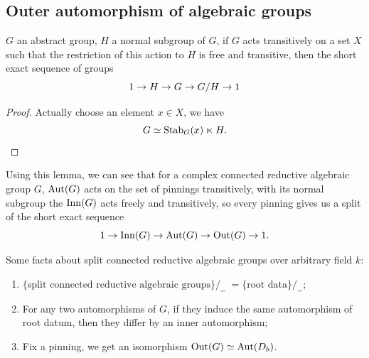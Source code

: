 \subsection{Outer automorphism of algebraic groups}

\begin{lem}
  $G$ an abstract group, $H$ a normal subgroup of $G$, if $G$ acts
  transitively on a set $X$ such that the restriction of this action
  to $H$ is free and transitive, then the short exact sequence of groups
  \[1\rightarrow H\rightarrow G\rightarrow G/H\rightarrow 1\]
\end{lem}

\begin{proof}
  Actually choose an element $x \in X$, we have
  \[ G \simeq \operatorname{Stab}_{G}(x) \ltimes H.\]
\end{proof}


Using this lemma, we can see that for a complex connected reductive
algebraic group $G$, $\operatorname{Aut}(G)$ acts on the set of pinnings transitively,
with its normal subgroup the $\operatorname{Inn}(G)$ acts freely and transitively,
so every pinning gives us a split of the short exact sequence
\[1\rightarrow \operatorname{Inn}(G)\rightarrow \operatorname{Aut}(G)\rightarrow \operatorname{Out}(G)\rightarrow 1.\]


Some facts about split connected reductive algebraic groups over arbitrary field $k$:
\begin{enumerate}
  \item $\{ \textrm{split connected reductive algebraic groups} \}/_\backsim \ = \{ \textrm{root data}\} /_\backsim $;
  \item For any two automorphisms of $G$, if they induce the same automorphism of root datum, then they differ by an inner automorphism;
  \item Fix a pinning, we get an isomorphism $\operatorname{Out}(G) \simeq \operatorname{Aut}(D_b)$.
\end{enumerate}
